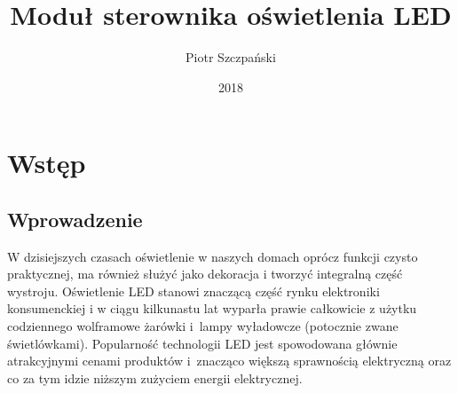 \documentclass[12pt, eng, twoside, openany, final]{mgr}
\author{Piotr Szczpański}
\title{Moduł sterownika oświetlenia LED}
\date{2018}
\begin{document}
\maketitle
\tableofcontents

\newpage

\pagestyle{fancy}
\fancyhead{} 
\fancyfoot{} 
\rfoot{\thepage}


\chapter{Wstęp}
\thispagestyle{fancy}
    \section{Wprowadzenie}
    W dzisiejszych czasach oświetlenie w naszych domach oprócz funkcji czysto praktycznej, ma również służyć jako dekoracja i tworzyć integralną część wystroju. Oświetlenie LED stanowi znaczącą część rynku elektroniki konsumenckiej i w ciągu kilkunastu lat wyparła prawie całkowicie z użytku codziennego wolframowe żarówki i~lampy wyładowcze (potocznie zwane świetlówkami). Popularność technologii LED jest spowodowana głównie atrakcyjnymi cenami produktów i~znacząco większą sprawnością elektryczną oraz co za tym idzie niższym zużyciem energii elektrycznej.
    
\end{document}
